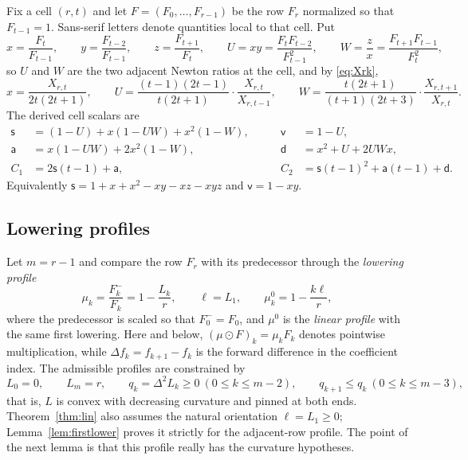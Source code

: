 \documentclass[11pt,a4paper]{article}
\theoremstyle{plain}
\theoremstyle{definition}
\theoremstyle{remark}
\newcommand{\ls}{\mathsf{s}}
\newcommand{\lv}{\mathsf{v}}
\newcommand{\la}{\mathsf{a}}
\newcommand{\ld}{\mathsf{d}}
\begin{document}
Fix a cell $(r,t)$ and let $F=(F_0,\dots,F_{r-1})$ be the row $F_r$ normalized
so that $F_{t-1}=1$. Sans-serif letters denote quantities local to that cell.
Put
\begin{equation}\label{eq:xyz}
  x=\frac{F_t}{F_{t-1}},\qquad
  y=\frac{F_{t-2}}{F_{t-1}},\qquad
  z=\frac{F_{t+1}}{F_t},\qquad
  U=xy=\frac{F_tF_{t-2}}{F_{t-1}^2},\qquad
  W=\frac{z}{x}=\frac{F_{t+1}F_{t-1}}{F_t^2},
\end{equation}
so $U$ and $W$ are the two adjacent Newton ratios at the cell, and by
\eqref{eq:Xrk},
\begin{equation}\label{eq:xX}
  x=\frac{X_{r,t}}{2t(2t+1)},\qquad
  U=\frac{(t-1)(2t-1)}{t(2t+1)}\cdot\frac{X_{r,t}}{X_{r,t-1}},\qquad
  W=\frac{t(2t+1)}{(t+1)(2t+3)}\cdot\frac{X_{r,t+1}}{X_{r,t}} .
\end{equation}
The derived cell scalars are
\begin{equation}\label{eq:cellscalars}
\begin{aligned}
  \ls&=(1-U)+x(1-UW)+x^2(1-W), &\qquad \lv&=1-U,\\
  \la&=x(1-UW)+2x^2(1-W),      &\qquad \ld&=x^2+U+2UWx,\\
  C_1&=2\ls(t-1)+\la,          &\qquad C_2&=\ls(t-1)^2+\la(t-1)+\ld .
\end{aligned}
\end{equation}
Equivalently $\ls=1+x+x^2-xy-xz-xyz$ and $\lv=1-xy$.

\subsection{Lowering profiles}

Let $m=r-1$ and compare the row $F_r$ with its predecessor through the
\emph{lowering profile}
\begin{equation}\label{eq:profile}
  \mu_k=\frac{F^-_k}{F_k}=1-\frac{L_k}{r},\qquad \ell=L_1,
  \qquad \mu^0_k=1-\frac{k\ell}{r},
\end{equation}
where the predecessor is scaled so that $F^-_0=F_0$, and $\mu^0$ is the
\emph{linear profile} with the same first lowering. Here and below,
$(\mu\odot F)_k=\mu_kF_k$ denotes pointwise multiplication, while
$\Delta f_k=f_{k+1}-f_k$ is the forward difference in the coefficient index.
The admissible profiles are constrained by
\begin{equation}\label{eq:L3}
  L_0=0,\qquad L_m=r,\qquad
  q_k=\Delta^2L_k\ge0\ (0\le k\le m-2),\qquad
  q_{k+1}\le q_k\ (0\le k\le m-3),
\end{equation}
that is, $L$ is convex with decreasing curvature and pinned at both ends.
Theorem~\ref{thm:lin} also assumes the natural orientation $\ell=L_1\ge0$;
Lemma~\ref{lem:firstlower} proves it strictly for the adjacent-row profile. The
point of the next lemma is that this profile really has the curvature
hypotheses.
\end{document}
